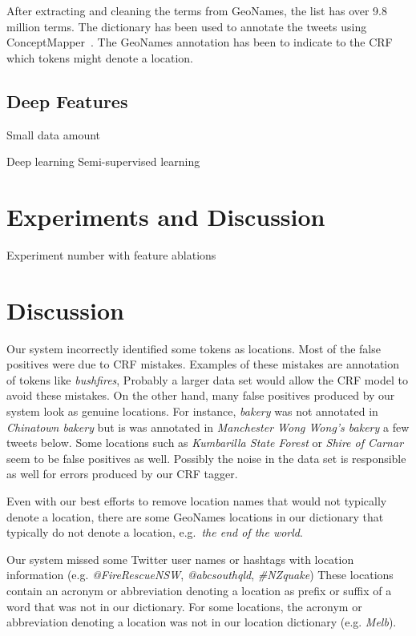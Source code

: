 \documentclass[11pt]{article}
\begin{document}
After extracting and cleaning the terms from GeoNames, the list has over 9.8 million terms.
The dictionary has been used to annotate the tweets using ConceptMapper~\cite{tanenblatt2010conceptmapper}.
The GeoNames annotation has been to indicate to the CRF which tokens might denote a location.

\subsection{Deep Features}

Small data amount

Deep learning
Semi-supervised learning



\section{Experiments and Discussion}
\label{sec:experiment}

Experiment number with feature ablations

\section{Discussion}
\label{sec:discussion}

Our system incorrectly identified some tokens as locations.
Most of the false positives were due to CRF mistakes.
Examples of these mistakes are annotation of tokens like \textit{bushfires}, 
Probably a larger data set would allow the CRF model to avoid these mistakes.
On the other hand, many false positives produced by our system look as genuine locations.
For instance, \textit{bakery} was not annotated in \textit{Chinatown bakery} but is was annotated in \textit{Manchester Wong Wong's bakery} a few tweets below.
Some locations such as \textit{Kumbarilla State Forest} or \textit{Shire of Carnar} seem to be false positives as well.
Possibly the noise in the data set is responsible as well for errors produced by our CRF tagger.

Even with our best efforts to remove location names that would not typically denote a location, there are some GeoNames locations in our dictionary that typically do not denote a location, e.g.~\textit{the end of the world}.

Our system missed some Twitter user names or hashtags with location information (e.g. \textit{@FireRescueNSW}, \textit{@abcsouthqld}, \textit{\#NZquake})
These locations contain an acronym or abbreviation denoting a location as prefix or suffix of a word that was not in our dictionary.
For some locations, the acronym or abbreviation denoting a location was not in our location dictionary (e.g. \textit{Melb}).
\end{document}

